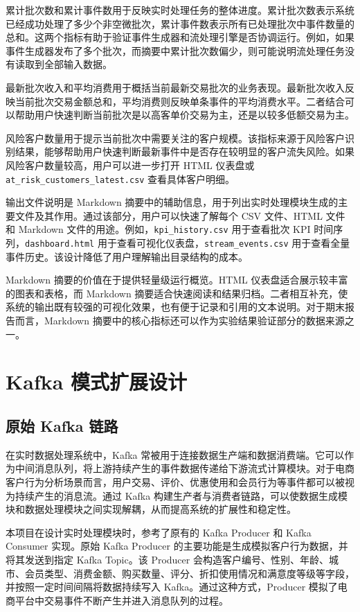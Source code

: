 \documentclass[12pt,hyperref,a4paper,UTF8]{ctexart}
\begin{document}
累计批次数和累计事件数用于反映实时处理任务的整体进度。累计批次数表示系统已经成功处理了多少个非空微批次，累计事件数表示所有已处理批次中事件数量的总和。这两个指标有助于验证事件生成器和流处理引擎是否协调运行。例如，如果事件生成器发布了多个批次，而摘要中累计批次数偏少，则可能说明流处理任务没有读取到全部输入数据。

最新批次收入和平均消费用于概括当前最新交易批次的业务表现。最新批次收入反映当前批次交易金额总和，平均消费则反映单条事件的平均消费水平。二者结合可以帮助用户快速判断当前批次是以高客单价交易为主，还是以较多低额交易为主。

风险客户数量用于提示当前批次中需要关注的客户规模。该指标来源于风险客户识别结果，能够帮助用户快速判断最新事件中是否存在较明显的客户流失风险。如果风险客户数量较高，用户可以进一步打开 HTML 仪表盘或 \texttt{at\_risk\_customers\_latest.csv} 查看具体客户明细。

输出文件说明是 Markdown 摘要中的辅助信息，用于列出实时处理模块生成的主要文件及其作用。通过该部分，用户可以快速了解每个 CSV 文件、HTML 文件和 Markdown 文件的用途。例如，\texttt{kpi\_history.csv} 用于查看批次 KPI 时间序列，\texttt{dashboard.html} 用于查看可视化仪表盘，\texttt{stream\_events.csv} 用于查看全量事件历史。该设计降低了用户理解输出目录结构的成本。

Markdown 摘要的价值在于提供轻量级运行概览。HTML 仪表盘适合展示较丰富的图表和表格，而 Markdown 摘要适合快速阅读和结果归档。二者相互补充，使系统的输出既有较强的可视化效果，也有便于记录和引用的文本说明。对于期末报告而言，Markdown 摘要中的核心指标还可以作为实验结果验证部分的数据来源之一。

\section{Kafka 模式扩展设计}

\subsection{原始 Kafka 链路}

在实时数据处理系统中，Kafka 常被用于连接数据生产端和数据消费端。它可以作为中间消息队列，将上游持续产生的事件数据传递给下游流式计算模块。对于电商客户行为分析场景而言，用户交易、评价、优惠使用和会员行为等事件都可以被视为持续产生的消息流。通过 Kafka 构建生产者与消费者链路，可以使数据生成模块和数据处理模块之间实现解耦，从而提高系统的扩展性和稳定性。

本项目在设计实时处理模块时，参考了原有的 Kafka Producer 和 Kafka Consumer 实现。原始 Kafka Producer 的主要功能是生成模拟客户行为数据，并将其发送到指定 Kafka Topic。该 Producer 会构造客户编号、性别、年龄、城市、会员类型、消费金额、购买数量、评分、折扣使用情况和满意度等级等字段，并按照一定时间间隔将数据持续写入 Kafka。通过这种方式，Producer 模拟了电商平台中交易事件不断产生并进入消息队列的过程。
\end{document}
